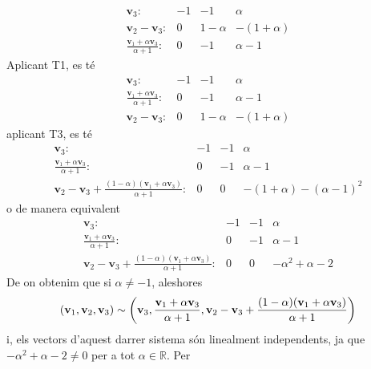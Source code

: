 \begin{solucio}
\begin{equation*}
\begin{array}{rrrr}
\mathbf{v}_{3}: & -1 & -1 & \alpha \\
\mathbf{v}_{2}-\mathbf{v}_{3}: & 0 & 1-\alpha & -(1+\alpha ) \\
\frac{\mathbf{v}_{1}+\alpha \mathbf{v}_{3}}{\alpha +1}: & 0 & -1 & \alpha -1%
\end{array}%
\end{equation*}%
Aplicant T1, es té%
\begin{equation*}
\begin{array}{rrrr}
\mathbf{v}_{3}: & -1 & -1 & \alpha \\
\frac{\mathbf{v}_{1}+\alpha \mathbf{v}_{3}}{\alpha +1}: & 0 & -1 & \alpha -1
\\
\mathbf{v}_{2}-\mathbf{v}_{3}: & 0 & 1-\alpha & -(1+\alpha )%
\end{array}%
\end{equation*}%
aplicant T3, es té%
\begin{equation*}
\begin{array}{rrrr}
\mathbf{v}_{3}: & -1 & -1 & \alpha \\
\frac{\mathbf{v}_{1}+\alpha \mathbf{v}_{3}}{\alpha +1}: & 0 & -1 & \alpha -1
\\
\mathbf{v}_{2}-\mathbf{v}_{3}+\frac{(1-\alpha )(\mathbf{v}_{1}+\alpha
\mathbf{v}_{3})}{\alpha +1}: & 0 & 0 & -(1+\alpha )-(\alpha -1)^{2}%
\end{array}%
\end{equation*}%
o de manera equivalent%
\begin{equation*}
\begin{array}{rrrr}
\mathbf{v}_{3}: & -1 & -1 & \alpha \\
\frac{\mathbf{v}_{1}+\alpha \mathbf{v}_{3}}{\alpha +1}: & 0 & -1 & \alpha -1
\\
\mathbf{v}_{2}-\mathbf{v}_{3}+\frac{(1-\alpha )(\mathbf{v}_{1}+\alpha
\mathbf{v}_{3})}{\alpha +1}: & 0 & 0 & -\alpha ^{2}+\alpha -2%
\end{array}%
\end{equation*}%
De on obtenim que si $\alpha \neq -1$, aleshores%
\begin{equation*}
(\mathbf{v}_{1},\mathbf{v}_{2},\mathbf{v}_{3})\sim \left( \mathbf{v}_{3},%
\frac{\mathbf{v}_{1}+\alpha \mathbf{v}_{3}}{\alpha +1},\mathbf{v}_{2}-%
\mathbf{v}_{3}+\frac{(1-\alpha )(\mathbf{v}_{1}+\alpha \mathbf{v}_{3})}{%
\alpha +1}\right)
\end{equation*}%
i, els vectors d’aquest darrer sistema són linealment independents,
ja que $-\alpha ^{2}+\alpha -2\neq 0$ per a tot $\alpha \in \mathbb{R}$. Per

\end{solucio}
